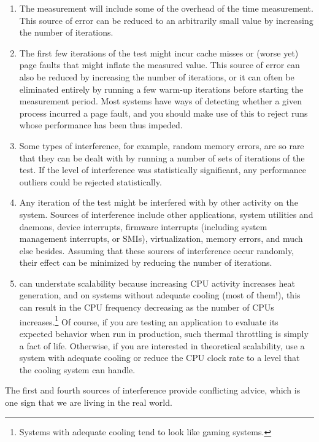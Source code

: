 \begin{enumerate}
\item	The measurement will include some of the overhead of
	the time measurement.
	This source of error can be reduced to an arbitrarily small
	value by increasing the number of iterations.
\item	The first few iterations of the test might incur cache misses
	or (worse yet) page faults that might inflate the measured
	value.
	This source of error can also be reduced by increasing the
	number of iterations, or it can often be eliminated entirely
	by running a few warm-up iterations before starting the
	measurement period.
	Most systems have ways of detecting whether a given process
	incurred a page fault, and you should make use of this to
	reject runs whose performance has been thus impeded.
\item	Some types of interference, for example, random memory errors,
	are so rare that they can be dealt with by running a number
	of sets of iterations of the test.
	If the level of interference was statistically significant,
	any performance outliers could be rejected statistically.
\item	Any iteration of the test might be interfered with by other
	activity on the system.
	Sources of interference include other applications, system
	utilities and daemons, device interrupts, firmware interrupts
	(including system management interrupts, or SMIs),
	virtualization, memory errors, and much else besides.
	Assuming that these sources of interference occur randomly,
	their effect can be minimized by reducing the number of
	iterations.
\item	{} can understate scalability because increasing
	CPU activity increases heat generation, and on systems without
	adequate cooling (most of them!), this can result in the CPU
	frequency decreasing as the number of CPUs increases.\footnote{
		Systems with adequate cooling tend to look like gaming systems.}
	Of course, if you are testing an application to evaluate its
	expected behavior when run in production, such thermal throttling
	is simply a fact of life.
	Otherwise, if you are interested in theoretical scalability,
	use a system with adequate cooling or reduce the CPU clock rate
	to a level that the cooling system can handle.
\end{enumerate}

The first and fourth sources of interference provide conflicting advice,
which is one sign that we are living in the real world.

